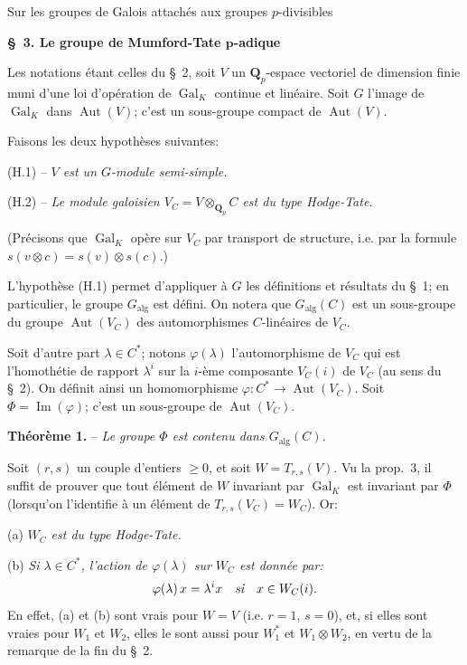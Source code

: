 \begin{center}\small Sur les groupes de Galois attachés aux groupes $p$-divisibles\end{center}
\begin{center}\textbf{\S~3. Le groupe de Mumford-Tate $\boldsymbol{p}$-adique}\end{center}

Les notations étant celles du \S~2, soit $V$ un $\mathbf{Q}_p$-espace vectoriel de dimension finie muni d’une loi d’opération de $\operatorname{Gal}_K$ continue et linéaire. Soit $G$ l’image de $\operatorname{Gal}_K$ dans $\operatorname{Aut}(V)$; c’est un sous-groupe compact de $\operatorname{Aut}(V)$.

Faisons les deux hypothèses suivantes:

(H.1) -- \textit{$V$ est un $G$-module semi-simple.}

(H.2) -- \textit{Le module galoisien $V_C=V\otimes_{\mathbf{Q}_p}C$ est du type Hodge-Tate.}

(Précisons que $\operatorname{Gal}_K$ opère sur $V_C$ par transport de structure, i.e. par la formule $s(v\otimes c)=s(v)\otimes s(c)$.)

L’hypothèse (H.1) permet d’appliquer à $G$ les définitions et résultats du \S~1; en particulier, le groupe $G_{\mathrm{alg}}$ est défini. On notera que $G_{\mathrm{alg}}(C)$ est un sous-groupe du groupe $\operatorname{Aut}(V_C)$ des automorphismes $C$-linéaires de $V_C$.

Soit d’autre part $\lambda\in C^*$; notons $\varphi(\lambda)$ l’automorphisme de $V_C$ qui est l’homothétie de rapport $\lambda^i$ sur la $i$-ème composante $V_C(i)$ de $V_C$ (au sens du \S~2). On définit ainsi un homomorphisme $\varphi:C^*\to\operatorname{Aut}(V_C)$. Soit $\varPhi=\operatorname{Im}(\varphi)$; c’est un sous-groupe de $\operatorname{Aut}(V_C)$.

\textbf{Théorème 1.} -- \textit{Le groupe $\varPhi$ est contenu dans $G_{\mathrm{alg}}(C)$.}

Soit $(r,s)$ un couple d’entiers $\geqslant 0$, et soit $W=T_{r,s}(V)$. Vu la prop.~3, il suffit de prouver que tout élément de $W$ invariant par $\operatorname{Gal}_K$ est invariant par $\varPhi$ (lorsqu’on l’identifie à un élément de $T_{r,s}(V_C)=W_C$). Or:

(a) \textit{$W_C$ est du type Hodge-Tate.}

(b) \textit{Si $\lambda\in C^*$, l’action de $\varphi(\lambda)$ sur $W_C$ est donnée par:}
\[
\varphi(\lambda)\,x=\lambda^ix\quad\text{\itshape si}\quad x\in W_C(i).
\]
En effet, (a) et (b) sont vrais pour $W=V$ (i.e. $r=1$, $s=0$), et, si elles sont vraies pour $W_1$ et $W_2$, elles le sont aussi pour $W_1^*$ et $W_1\otimes W_2$, en vertu de la remarque de la fin du \S~2.

